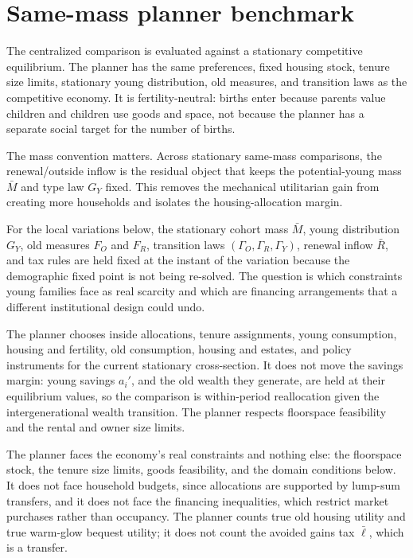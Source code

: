 \documentclass[11pt]{article}
\newcommand{\1}{\mathbf 1}
\begin{document}
\section{Same-mass planner benchmark}

The centralized comparison is evaluated against a stationary competitive equilibrium. The planner has the same preferences, fixed housing stock, tenure size limits, stationary young distribution, old measures, and transition laws as the competitive economy. It is fertility-neutral: births enter because parents value children and children use goods and space, not because the planner has a separate social target for the number of births.

The mass convention matters. Across stationary same-mass comparisons, the renewal/outside inflow is the residual object that keeps the potential-young mass $\bar M$ and type law $G_Y$ fixed. This removes the mechanical utilitarian gain from creating more households and isolates the housing-allocation margin.

For the local variations below, the stationary cohort mass $\bar M$, young distribution $G_Y$, old measures $F_O$ and $F_R$, transition laws $(\Gamma_O,\Gamma_R,\Gamma_Y)$, renewal inflow $\bar R$, and tax rules are held fixed at the instant of the variation because the demographic fixed point is not being re-solved. The question is which constraints young families face as real scarcity and which are financing arrangements that a different institutional design could undo.

The planner chooses inside allocations, tenure assignments, young consumption, housing and fertility, old consumption, housing and estates, and policy instruments for the current stationary cross-section. It does not move the savings margin: young savings $a_i'$, and the old wealth they generate, are held at their equilibrium values, so the comparison is within-period reallocation given the intergenerational wealth transition. The planner respects floorspace feasibility and the rental and owner size limits.

The planner faces the economy's real constraints and nothing else: the floorspace stock, the tenure size limits, goods feasibility, and the domain conditions below. It does not face household budgets, since allocations are supported by lump-sum transfers, and it does not face the financing inequalities, which restrict market purchases rather than occupancy. The planner counts true old housing utility and true warm-glow bequest utility; it does not count the avoided gains tax $\bar\ell$, which is a transfer.
\end{document}
